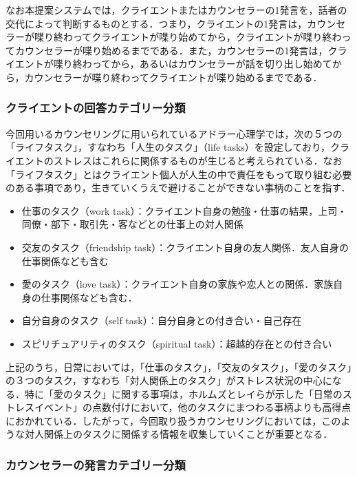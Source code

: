 \documentclass[shuuron]{kuee}
\begin{document}
なお本提案システムでは，クライエントまたはカウンセラーの1発言を，話者の交代によって判断するものとする．つまり，クライエントの1発言は，カウンセラーが喋り終わってクライエントが喋り始めてから，クライエントが喋り終わってカウンセラーが喋り始めるまでである．また，カウンセラーの1発言は，クライエントが喋り終わってから，あるいはカウンセラーが話を切り出し始めてから，カウンセラーが喋り終わってクライエントが喋り始めるまでである．

\subsubsection{クライエントの回答カテゴリー分類}


今回用いるカウンセリングに用いられているアドラー心理学では，次の５つの「ライフタスク」，すなわち「人生のタスク」（life tasks）を設定しており，クライエントのストレスはこれらに関係するものが生じると考えられている．なお「ライフタスク」とはクライエント個人が人生の中で責任をもって取り組む必要のある事項であり，生きていくうえで避けることができない事柄のことを指す．
\begin{itemize}
  \item 仕事のタスク（work task）：クライエント自身の勉強・仕事の結果，上司・同僚・部下・取引先・客などとの仕事上の対人関係
  \item 交友のタスク（friendship task）：クライエント自身の友人関係．友人自身の仕事関係なども含む
  \item 愛のタスク（love task）：クライエント自身の家族や恋人との関係．家族自身の仕事関係なども含む．
  \item 自分自身のタスク（self task）：自分自身との付き合い・自己存在
  \item スピリチュアリティのタスク（spiritual task）：超越的存在との付き合い\cite{大友秀治2013全人的人間理解を促進するスピリチュアリティ概念に関する一考察}
\end{itemize}

上記のうち，日常においては，「仕事のタスク」，「交友のタスク」，「愛のタスク」の３つのタスク，すなわち「対人関係上のタスク」がストレス状況の中心になる．特に「愛のタスク」に関する事項は，ホルムズとレイら\cite{holmes1967social}が示した「日常のストレスイベント」の点数付けにおいて，他のタスクにまつわる事柄よりも高得点におかれている．したがって，今回取り扱うカウンセリングにおいては，このような対人関係上のタスクに関係する情報を収集していくことが重要となる．

\subsubsection{カウンセラーの発言カテゴリー分類}
\end{document}
